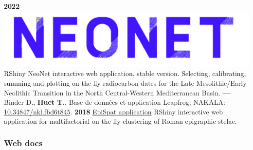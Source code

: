 \documentclass{article}
\begin{document}
\textbf{2022 }\href{http://shinyserver.cfs.unipi.it:3838/C14/}{\includegraphics[scale=0.04]{neonet-blue.png}} \textsf{RShiny} NeoNet interactive web application, stable version. Selecting, calibrating, summing and plotting on-the-fly radiocarbon dates for the Late Mesolithic/Early Neolithic Transition in the North Central-Western Mediterranean Basin.
\smallbreak
\textbf{--- } Binder D., \textbf{Huet T.}, Base de données et application Leapfrog, NAKALA: \href{https://nakala.fr/10.34847/nkl.fbd6t845}{10.34847/nkl.fbd6t845}.
\smallbreak
\textbf{2018 }\href{https://epispat.shinyapps.io/analyses_mult_5/}{EpiSpat application} \textsf{RShiny} interactive web application for multifactorial on-the-fly clustering of Roman epigraphic stelae.
\smallbreak

\subsubsection*{Web docs}
\end{document}
